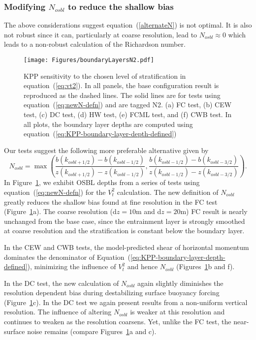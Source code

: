 \documentclass[preprint,12pt,authoryear]{agujournal}
\begin{document}
\subsubsection{Modifying $N_{osbl}$ to reduce the shallow bias}
\label{section:modifyNosbl}
The above considerations suggest equation~(\ref{alternateN}) is not optimal. It is also not robust since it can, particularly at coarse resolution, lead to $N_{osbl} \approx 0$ which leads to a non-robust calculation of the Richardson number. 


\begin{figure}[thbp]
\centering\texttt{[image: Figures/boundaryLayersN2.pdf]}
\caption{KPP sensitivity to the chosen level of stratification in equation~(\ref{eq:vt2}).  In all panels, the base configuration result is reproduced as the dashed lines.  The solid lines are for tests using equation~(\ref{eq:newN-defn}) and are tagged N2.  (a) FC test, (b) CEW test, (c) DC test, (d) HW test, (e) FCML test, and (f) CWB test.  In all plots, the boundary layer depths are computed using equation~(\ref{eq:KPP-boundary-layer-depth-defined})}
\label{n2_osbl_comparison}
\end{figure} 

Our tests suggest the following more preferable alternative given by 
\begin{equation}
\label{eq:newN-defn}
N_{osbl} = \max\left(\frac{b(k_{osbl+1/2}) - b(k_{osbl-1/2})}{z(k_{osbl+1/2}) - z(k_{osbl-1/2})},\frac{b(k_{osbl-1/2}) - b(k_{osbl-3/2})}{z(k_{osbl-1/2}) - z(k_{osbl-3/2})}\right).
\end{equation}
In Figure~\ref{n2_osbl_comparison}, we exhibit OSBL depths from a series of tests using equation~(\ref{eq:newN-defn}) for the $V_t^2$ calculation.  The new definition of $N_{osbl}$ greatly reduces the shallow bias found at fine resolution in the FC test (Figure~\ref{n2_osbl_comparison}a). The coarse resolution (d$z = 10$m and d$z = 20$m) FC result is nearly unchanged from the base case, since the entrainment layer is strongly smoothed at coarse resolution and the stratification is constant below the boundary layer.

In the CEW and CWB tests, the model-predicted shear of horizontal momentum dominates the denominator of Equation~(\ref{eq:KPP-boundary-layer-depth-defined}), minimizing the influence of $V_t^2$ and hence $N_{osbl}$ (Figures~\ref{n2_osbl_comparison}b and f).

In the DC test, the new calculation of $N_{osbl}$ again slightly diminishes the resolution dependent bias during destabilizing surface buoyancy forcing (Figure~\ref{n2_osbl_comparison}c).  In the DC test we again present results from a non-uniform vertical resolution.  The influence of altering $N_{osbl}$ is weaker at this resolution and continues to weaken as the resolution coarsens.  Yet, unlike the FC test, the near-surface noise remains (compare Figures~\ref{n2_osbl_comparison}a and c). 
\end{document}
